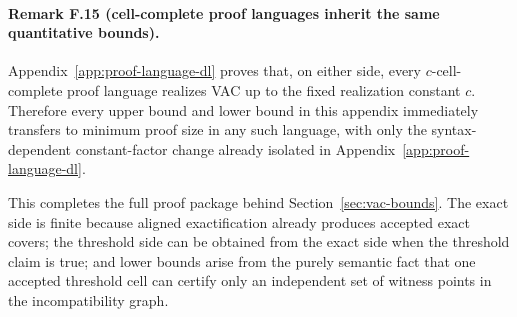\paragraph{Remark F.15 (cell-complete proof languages inherit the same quantitative bounds).}
Appendix~\ref{app:proof-language-dl} proves that, on either side, every $c$-cell-complete proof language realizes VAC up to the fixed realization constant $c$. Therefore every upper bound and lower bound in this appendix immediately transfers to minimum proof size in any such language, with only the syntax-dependent constant-factor change already isolated in Appendix~\ref{app:proof-language-dl}.

This completes the full proof package behind Section~\ref{sec:vac-bounds}. The exact side is finite because aligned exactification already produces accepted exact covers; the threshold side can be obtained from the exact side when the threshold claim is true; and lower bounds arise from the purely semantic fact that one accepted threshold cell can certify only an independent set of witness points in the incompatibility graph.
